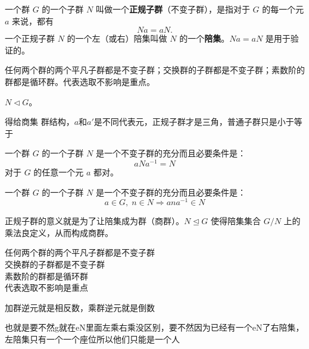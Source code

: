 \begin{definition}
一个群 $G$ 的一个子群 $N$ 叫做一个\textbf{正规子群}（不变子群），是指对于 $G$ 的每一个元 $a$ 来说，都有
\[
Na=aN.
\]
一个正规子群 $N$ 的一个左（或右）陪集叫做 $N$ 的一个\textbf{陪集}。$Na=aN$ 是用于验证的。

任何两个群的两个平凡子群都是不变子群；交换群的子群都是不变子群；素数阶的群都是循环群。代表选取不影响是重点。
\end{definition}

\begin{definition}[正规子群（定义 1.29）]
$N\triangleleft G$。
\end{definition}

\begin{note}[定义1 29正规子群]
得给商集 群结构，$a$和$a'$是不同代表元，正规子群才是三角，普通子群只是小于等于
\end{note}

\begin{theorem}[定理 1：不变子群的判定]
一个群 $G$ 的一个子群 $N$ 是一个不变子群的充分而且必要条件是：
\[
aNa^{-1}=N
\]
对于 $G$ 的任意一个元 $a$ 都对。
\end{theorem}

\begin{theorem}[定理 2：不变子群判定方式 2]
一个群 $G$ 的一个子群 $N$ 是一个不变子群的充分而且必要条件是：
\[
a\in G,\;n\in N\Rightarrow ana^{-1}\in N
\]
\end{theorem}

\begin{lemma}[引理 1.4：正规子群]
正规子群的意义就是为了让陪集成为群（商群）。$N\trianglelefteq G$ 使得陪集集合 $G/N$ 上的乘法良定义，从而构成商群。
\end{lemma}

\begin{note}[正规子群定义]
任何两个群的两个平凡子群都是不变子群 \\
交换群的子群都是不变子群 \\
素数阶的群都是循环群 \\
代表选取不影响是重点
\end{note}

\begin{note}[正规子群的意义就是为了让看看陪集是不是群]
加群逆元就是相反数，乘群逆元就是倒数
\end{note}

\begin{note}
也就是要不然g就在eN里面左乘右乘没区别，要不然因为已经有一个eN了右陪集，左陪集只有一个一个座位所以他们只能是一个人
\end{note}

